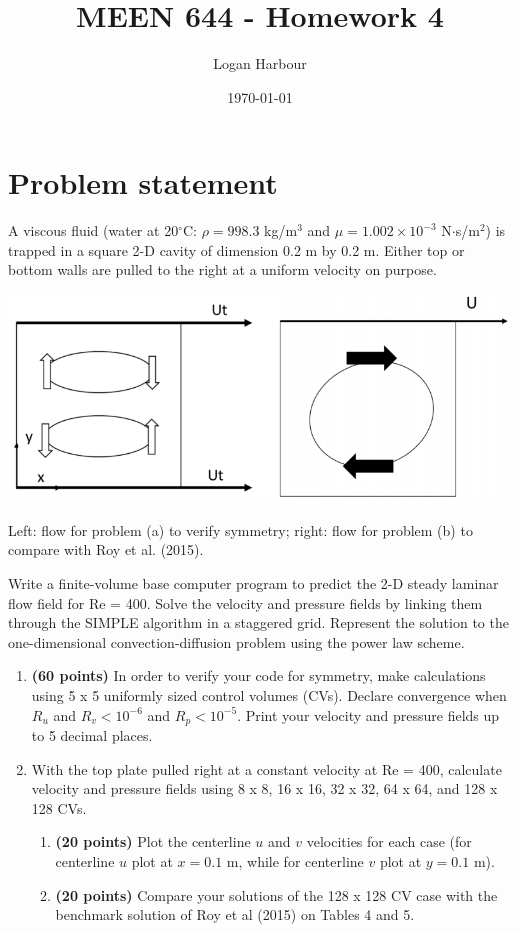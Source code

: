 \documentclass{article}
\newcommand{\pageTitle}{MEEN 644 - Homework 4}
\newcommand{\pageAuthor}{Logan Harbour}
\begin{document}
\title{\LARGE \textbf{\pageTitle} \vspace{-0.3cm}}
\author{\large \pageAuthor}
\date{\vspace{-0.6cm} \large \today \vspace{-0.4cm}}

\maketitle

\section{Problem statement}

A viscous fluid (water at 20$^\circ$C: $\rho = 998.3$ kg/m$^3$ and $\mu = 1.002\times 10^{-3}$ N$\cdot$s/m$^2$) is trapped in a square 2-D cavity of dimension 0.2 m by 0.2 m. Either top or bottom walls are pulled to the right at a uniform velocity on purpose.

\begin{center}
	\includegraphics[width=0.6\linewidth]{statement}
	
	{\small Left: flow for problem (a) to verify symmetry; right: flow for problem (b) to compare with Roy et al. (2015).}
\end{center}

Write a finite-volume base computer program to predict the 2-D steady laminar flow field for Re = 400. Solve the velocity and pressure fields by linking them through the SIMPLE algorithm in a staggered grid. Represent the solution to the one-dimensional convection-diffusion problem using the power law scheme.

\begin{enumerate}[label=(\alph*)]
	\item \textbf{(60 points)} In order to verify your code for symmetry, make calculations using 5 x 5 uniformly sized control volumes (CVs). Declare convergence when $R_u$ and $R_v < 10^{-6}$ and $R_p < 10^{-5}$. Print your velocity and pressure fields up to 5 decimal places. 
	\item With the top plate pulled right at a constant velocity at Re = 400, calculate velocity and pressure fields using 8 x 8, 16 x 16, 32 x 32, 64 x 64, and 128 x 128 CVs.
	\begin{enumerate}[label=\roman*)]
		\item \textbf{(20 points)} Plot the centerline $u$ and $v$ velocities for each case (for centerline $u$ plot at $x = 0.1$ m, while for centerline $v$ plot at $y = 0.1$ m).
		\item \textbf{(20 points)} Compare your solutions of the 128 x 128 CV case with the benchmark solution of Roy et al (2015) on Tables 4 and 5.
	\end{enumerate}
\end{enumerate}
\end{document}
